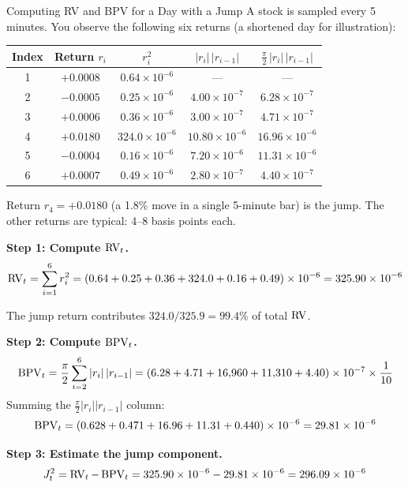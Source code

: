 \begin{workedexample}{Computing RV and BPV for a Day with a Jump}
A stock is sampled every 5 minutes.
You observe the following six returns (a shortened day for illustration):

\medskip
\begin{center}
\begin{tabular}{@{} c c c c c @{}}
\toprule
\textbf{Index} & \textbf{Return $r_i$} & \textbf{$r_i^2$} & \textbf{$|r_i|\,|r_{i-1}|$} & \textbf{$\frac{\pi}{2}\,|r_i|\,|r_{i-1}|$} \\
\midrule
1 & $+0.0008$ & $0.64 \times 10^{-6}$  & ---                           & ---                           \\
2 & $-0.0005$ & $0.25 \times 10^{-6}$  & $4.00 \times 10^{-7}$         & $6.28 \times 10^{-7}$         \\
3 & $+0.0006$ & $0.36 \times 10^{-6}$  & $3.00 \times 10^{-7}$         & $4.71 \times 10^{-7}$         \\
4 & $+0.0180$ & $324.0 \times 10^{-6}$ & $10.80 \times 10^{-6}$        & $16.96 \times 10^{-6}$        \\
5 & $-0.0004$ & $0.16 \times 10^{-6}$  & $7.20 \times 10^{-6}$         & $11.31 \times 10^{-6}$        \\
6 & $+0.0007$ & $0.49 \times 10^{-6}$  & $2.80 \times 10^{-7}$         & $4.40 \times 10^{-7}$         \\
\bottomrule
\end{tabular}
\end{center}
\medskip

Return $r_4 = +0.0180$ (a 1.8\% move in a single 5-minute bar) is the jump.
The other returns are typical: 4--8 basis points each.

\textbf{Step 1: Compute $\operatorname{RV}_t$.}
\[
  \operatorname{RV}_t = \sum_{i=1}^{6} r_i^2 = (0.64 + 0.25 + 0.36 + 324.0 + 0.16 + 0.49)\times 10^{-6} = 325.90 \times 10^{-6}
\]

The jump return contributes $324.0 / 325.9 = 99.4\%$ of total $\operatorname{RV}$.

\textbf{Step 2: Compute $\operatorname{BPV}_t$.}
\[
  \operatorname{BPV}_t = \frac{\pi}{2}\sum_{i=2}^{6}|r_i|\,|r_{i-1}| = (6.28 + 4.71 + 16{,}960 + 11{,}310 + 4.40) \times 10^{-7} \times \frac{1}{10}
\]
Summing the $\frac{\pi}{2}|r_i||r_{i-1}|$ column:
\[
  \operatorname{BPV}_t = (0.628 + 0.471 + 16.96 + 11.31 + 0.440) \times 10^{-6} = 29.81 \times 10^{-6}
\]

\textbf{Step 3: Estimate the jump component.}
\[
  J_t^2 = \operatorname{RV}_t - \operatorname{BPV}_t = 325.90 \times 10^{-6} - 29.81 \times 10^{-6} = 296.09 \times 10^{-6}
\]


\end{workedexample}
